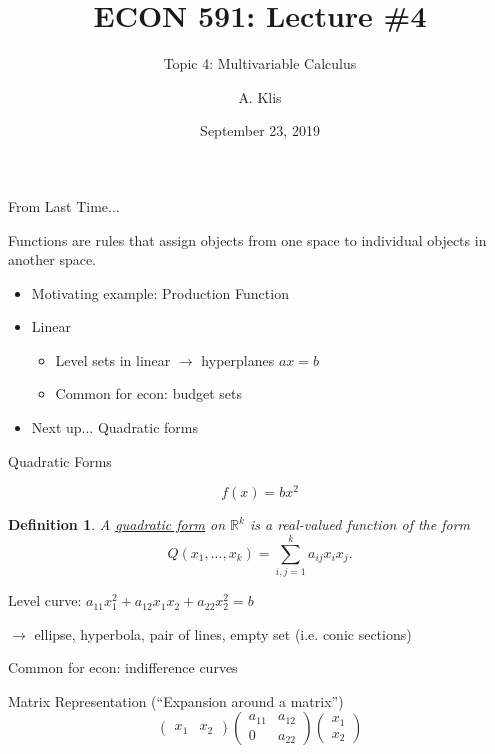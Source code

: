 \documentclass[xcolor=dvipsnames, compress, t]{beamer}
\title[\#4 (Topic 4)]{ECON 591: Lecture \#4}
\subtitle{Topic 4: Multivariable Calculus}
\author{A. Klis}
\institute[NIU]{\vspace{-10pt} \large Northern Illinois University}
\date{September 23, 2019}
\newtheorem{defin}{Definition}
\newcommand{\vs}{\vspace{\baselineskip}}
\begin{document}
\begin{frame}
\titlepage
\end{frame}


\begin{frame}{From Last Time...} 

Functions are rules that assign objects from one space to individual objects in another space.
\begin{itemize}
\item {\color{MidnightBlue}Motivating example: Production Function}
\item Linear
\begin{itemize}
\item Level sets in linear $\rightarrow$ hyperplanes $a x = b$
\item {\color{MidnightBlue} Common for econ: budget sets}
\end{itemize} \pause
\item Next up... Quadratic forms
\end{itemize}

\end{frame}


\begin{frame}{Quadratic Forms}

{\color{Orchid} $$f(x) = bx^2$$} 

\vspace{-\baselineskip}

\begin{defin}
A \underline{quadratic form} on $\mathds{R}^k$ is a real-valued function of the form $$Q(x_1, ..., x_k) = \sum_{i, j=1}^k a_{ij} x_i x_j.$$
\end{defin} \pause

Level curve:  $a_{11} x_1^2 + a_{12} x_1 x_2 + a_{22} x_2^2 = b$

$\rightarrow$ ellipse, hyperbola, pair of lines, empty set (i.e. conic sections) 

{\color{MidnightBlue} Common for econ: indifference curves}\pause

\vs Matrix Representation (``Expansion around a matrix'')
$$\begin{pmatrix}x_1 & x_2 \end{pmatrix} \begin{pmatrix} a_{11} & a_{12} \\ 0 & a_{22} \end{pmatrix} \begin{pmatrix} x_1 \\ x_2 \end{pmatrix} $$

\end{frame}
\end{document}
